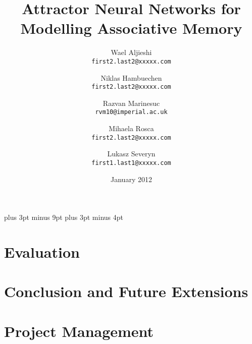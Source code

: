 \documentclass[11pt,a4paper,oneside]{report}
\title{Attractor Neural Networks for Modelling Associative Memory}
\date{January 2012}
\author{
  Wael Aljieshi\\
  \texttt{first2.last2@xxxxx.com}
  \and
  Niklas Hambuechen\\
  \texttt{first2.last2@xxxxx.com}
  \and
  Razvan Marinesuc\\
  \texttt{rvm10@imperial.ac.uk}
  \and
  Mihaela Rosca\\
  \texttt{first2.last2@xxxxx.com}
  \and
  Lukasz Severyn\\
  \texttt{first1.last1@xxxxx.com}
}
\begin{document}
\belowdisplayskip=12pt plus 3pt minus 9pt
\belowdisplayshortskip=7pt plus 3pt minus 4pt







\maketitle{}


\renewcommand{\abstractname}{Executive Summary}



\tableofcontents










\chapter{Evaluation}




\chapter{Conclusion and Future Extensions}

\chapter{Project Management}
\end{document}
